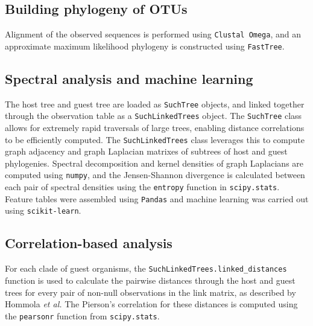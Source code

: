 \subsection{Building phylogeny of OTUs}

Alignment of the observed sequences is performed using {\tt Clustal Omega}, \cite{goujon2010new, sievers2011fast} and an approximate maximum likelihood phylogeny is constructed using {\tt FastTree}. \cite{price2009fasttree, price2010fasttree}




\subsection{Spectral analysis and machine learning}

The host tree and guest tree are loaded as {\tt SuchTree} objects, and linked together through the observation table as a {\tt SuchLinkedTrees} object. The {\tt SuchTree} class allows for extremely rapid traversals of large trees, enabling distance correlations to be efficiently computed. The {\tt SuchLinkedTrees} class leverages this to compute graph adjacency and graph Laplacian matrixes of subtrees of host and guest phylogenies. Spectral decomposition and kernel densities of graph Laplacians are computed using {\tt numpy}, and the Jensen-Shannon divergence is calculated between each pair of spectral densities using the {\tt entropy} function in {\tt scipy.stats}. \cite{walt2011numpy} Feature tables were assembled using {\tt Pandas} \cite{mckinney2010data} and machine learning was carried out using {\tt scikit-learn}. \cite{pedregosa2011scikit}

\subsection{Correlation-based analysis}

For each clade of guest organisms, the {\tt SuchLinkedTrees.linked\_distances} function is used to calculate the pairwise distances through the host and guest trees for every pair of non-null observations in the link matrix, as described by Hommola {\em et al.} \cite{hommola2009permutation} The Pierson's correlation for these distances is computed using the {\tt pearsonr} function from {\tt scipy.stats}. \cite{walt2011numpy}

